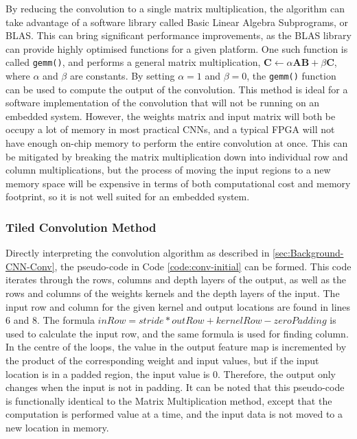 \documentclass[12pt]{article}
\begin{document}
By reducing the convolution to a single matrix multiplication, the algorithm can take advantage of a software library called Basic Linear Algebra Subprograms, or BLAS. This can bring significant performance improvements, as the BLAS library can provide highly optimised functions for a given platform. One such function is called \lstinline|gemm()|, and performs a general matrix multiplication, $\mathbf{C} \gets \alpha\mathbf{A}\mathbf{B} + \beta\mathbf{C}$, where $\alpha$ and $\beta$ are constants. By setting $\alpha = 1$ and $\beta = 0$, the \lstinline|gemm()| function can be used to compute the output of the convolution. This method is ideal for a software implementation of the convolution that will not be running on an embedded system. However, the weights matrix and input matrix will both be occupy a lot of memory in most practical CNNs, and a typical FPGA will not have enough on-chip memory to perform the entire convolution at once. This can be mitigated by breaking the matrix multiplication down into individual row and column multiplications, but the process of moving the input regions to a new memory space will be expensive in terms of both computational cost and memory footprint, so it is not well suited for an embedded system.

\subsubsection{Tiled Convolution Method}
\label{sec:Design-Conv-TC}

Directly interpreting the convolution algorithm as described in \ref{sec:Background-CNN-Conv}, the pseudo-code in Code \ref{code:conv-initial} can be formed. This code iterates through the rows, columns and depth layers of the output, as well as the rows and columns of the weights kernels and the depth layers of the input. The input row and column for the given kernel and output locations are found in lines 6 and 8. The formula $inRow = stride * outRow + kernelRow - zeroPadding$ is used to calculate the input row, and the same formula is used for finding column. In the centre of the loops, the value in the output feature map is incremented by the product of the corresponding weight and input values, but if the input location is in a padded region, the input value is 0. Therefore, the output only changes when the input is not in padding. It can be noted that this pseudo-code is functionally identical to the Matrix Multiplication method, except that the computation is performed value at a time, and the input data is not moved to a new location in memory.
\end{document}
